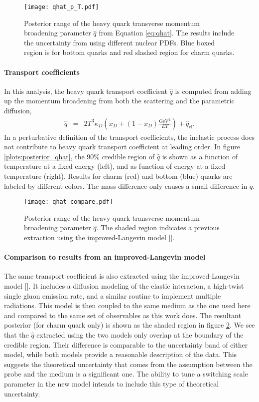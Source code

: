 \begin{figure}
\texttt{[image: qhat\_p\_T.pdf]}
\caption{Posterior range of the heavy quark transverse momentum broadening parameter $\hat{q}$ from Equation \ref{eq:qhat}. The results include the uncertainty from using different nuclear PDFs. Blue boxed region is for bottom quarks and red slashed region for charm quarks.}\label{fig:posterior_qhat}
\end{figure}

\paragraph{Transport coefficients} In this analysis, the heavy quark transport coefficient $\hat{q}$ is computed from adding up the momentum broadening from both the scattering and the parametric diffusion,
\begin{eqnarray}\label{eq:qhat}
\hat{q} &=& 2T^3\kappa_D\left(x_D + (1-x_D)\frac{\textrm{GeV}^2}{ET}\right) + \hat{q}_{\textrm{el}}.
\end{eqnarray}
In a perturbative definition of the transport coefficients, the inelastic process does not contribute to heavy quark transport coefficient at leading order. 
In figure \ref{plots:posterior_qhat}, the 90\% credible region of $\hat{q}$ is shown as a function of temperature at a fixed energy (left), and as function of energy at a fixed temperature (right).
Results for charm (red) and bottom (blue) quarks are labeled by different colors.
The mass difference only causes a small difference in $\hat{q}$.

\begin{figure}
\texttt{[image: qhat\_compare.pdf]}
\caption{Posterior range of the heavy quark transverse momentum broadening parameter $\hat{q}$. The shaded region indicates a previous extraction using the improved-Langevin model [].}\label{fig:compare_qhat}
\end{figure}

\paragraph{Comparison to results from an improved-Langevin model}
The same transport coefficient is also extracted using the improved-Langevin model [].
It includes a diffusion modeling of the elastic interacton, a high-twist single gluon emission rate, and a similar routine to implement multiple radiations.
This model is then coupled to the same medium as the one used here and compared to the same set of observables as this work does.
The resultant posterior (for charm quark only) is shown as the shaded region in figure \ref{fig:compare_qhat}.
We see that the $\hat{q}$ extracted using the two models only overlap at the boundary of the credible region.
Their difference is comparable to the uncertainty band of either model, while both models provide a reasonable description of the data.
This suggests the theoretical uncertainty that comes from the assumption between the probe and the medium is a significant one.
The ability to tune a switching scale parameter in the new model intends to include this type of theoretical uncertainty.

